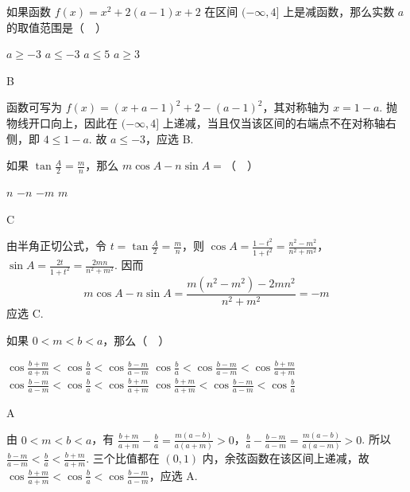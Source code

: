 \documentclass[UTF8,a4paper,oneside,11pt]{ctexbook}
\begin{document}
\begin{problem}
如果函数 \(f(x)=x^2+2(a-1)x+2\) 在区间 \((-\infty,4]\) 上是减函数，那么实数 \(a\) 的取值范围是（\(\quad\)）

\choices
    {\(a\geqslant -3\)}
    {\(a\leqslant -3\)}
    {\(a\leqslant 5\)}
    {\(a\geqslant 3\)}
\end{problem}

\begin{answer}
B
\end{answer}

\begin{solution}
函数可写为 \(f(x)=\left(x+a-1\right)^2+2-(a-1)^2\)，其对称轴为 \(x=1-a\). 抛物线开口向上，因此在 \((-\infty,4]\) 上递减，当且仅当该区间的右端点不在对称轴右侧，即 \(4\leqslant1-a\). 故 \(a\leqslant-3\)，应选 B.
\end{solution}

\begin{problem}
如果 \(\tan \frac{A}{2}=\frac{m}{n}\)，那么 \(m\cos A-n\sin A=\)（\(\quad\)）

\choices
    {\(n\)}
    {\(-n\)}
    {\(-m\)}
    {\(m\)}
\end{problem}

\begin{answer}
C
\end{answer}

\begin{solution}
由半角正切公式，令 \(t=\tan\frac A2=\frac mn\)，则
\(\cos A=\frac{1-t^2}{1+t^2}=\frac{n^2-m^2}{n^2+m^2}\)，\(\sin A=\frac{2t}{1+t^2}=\frac{2mn}{n^2+m^2}\). 因而
\[
m\cos A-n\sin A
=\frac{m(n^2-m^2)-2mn^2}{n^2+m^2}
=-m
\]
应选 C.
\end{solution}

\begin{problem}
如果 \(0<m<b<a\)，那么（\(\quad\)）

\choices
    {\(\cos \frac{b+m}{a+m}<\cos \frac{b}{a}<\cos \frac{b-m}{a-m}\)}
    {\(\cos \frac{b}{a}<\cos \frac{b-m}{a-m}<\cos \frac{b+m}{a+m}\)}
    {\(\cos \frac{b-m}{a-m}<\cos \frac{b}{a}<\cos \frac{b+m}{a+m}\)}
    {\(\cos \frac{b+m}{a+m}<\cos \frac{b-m}{a-m}<\cos \frac{b}{a}\)}
\end{problem}

\begin{answer}
A
\end{answer}

\begin{solution}
由 \(0<m<b<a\)，有
\(\frac{b+m}{a+m}-\frac ba=\frac{m(a-b)}{a(a+m)}>0\)，\(\frac ba-\frac{b-m}{a-m}=\frac{m(a-b)}{a(a-m)}>0\).
所以 \(\frac{b-m}{a-m}<\frac ba<\frac{b+m}{a+m}\). 三个比值都在 \((0,1)\) 内，余弦函数在该区间上递减，故
\(\cos\frac{b+m}{a+m}<\cos\frac ba<\cos\frac{b-m}{a-m}\)，应选 A.
\end{solution}
\end{document}

